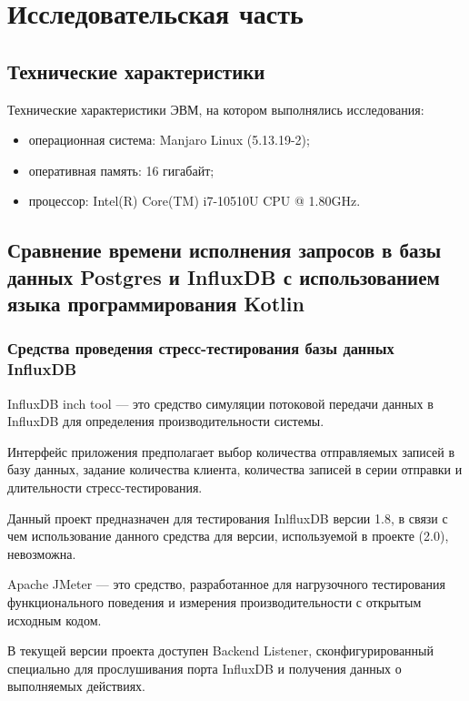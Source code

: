 \section{Исследовательская часть}

\subsection{Технические характеристики}

Технические характеристики ЭВМ, на котором выполнялись исследования:

\begin{itemize}[leftmargin=1.6\parindent]
\item операционная система: Manjaro Linux (5.13.19-2);
\item оперативная память: 16 гигабайт;
\item процессор: Intel(R) Core(TM) i7-10510U CPU @ 1.80GHz.
\end{itemize}

\subsection{Сравнение времени исполнения запросов в базы данных Postgres и InfluxDB с использованием языка программирования Kotlin}

\subsubsection{Средства проведения стресс-тестирования базы данных InfluxDB}

InfluxDB inch tool \cite{inchTool} --- это средство симуляции потоковой передачи данных в InfluxDB для определения производительности системы.

Интерфейс приложения предполагает выбор количества отправляемых записей в базу данных, задание количества клиента, количества записей в серии отправки и длительности стресс-тестирования.

Данный проект предназначен для тестирования InlfluxDB версии 1.8, в связи с чем использование данного средства для версии, используемой в проекте (2.0), невозможна.

Apache JMeter \cite{jmeter} --- это средство, разработанное для нагрузочного тестирования функционального поведения и измерения производительности с открытым исходным кодом.

В текущей версии проекта доступен Backend Listener, сконфигурированный специально для прослушивания порта InfluxDB и получения данных о выполняемых действиях.

